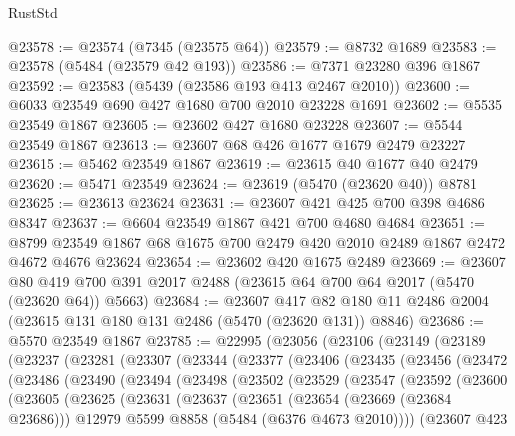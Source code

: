 \begin{lexlean}{RustStd}
\begin{coremodule}
@23578 := @23574 (@7345 (@23575 @64))
@23579 := @8732 @1689
@23583 := @23578 (@5484 (@23579 @42 @193))
@23586 := @7371 @23280 @396 @1867
@23592 := @23583 (@5439 (@23586 @193 @413 @2467 @2010))
@23600 := @6033 @23549 @690 @427 @1680 @700 @2010 @23228 @1691
@23602 := @5535 @23549 @1867
@23605 := @23602 @427 @1680 @23228
@23607 := @5544 @23549 @1867
@23613 := @23607 @68 @426 @1677 @1679 @2479 @23227
@23615 := @5462 @23549 @1867
@23619 := @23615 @40 @1677 @40 @2479
@23620 := @5471 @23549
@23624 := @23619 (@5470 (@23620 @40)) @8781
@23625 := @23613 @23624
@23631 := @23607 @421 @425 @700 @398 @4686 @8347
@23637 := @6604 @23549 @1867 @421 @700 @4680 @4684
@23651 := @8799 @23549 @1867 @68 @1675 @700 @2479 @420 @2010 @2489 @1867 @2472 @4672 @4676 @23624
@23654 := @23602 @420 @1675 @2489
@23669 := @23607
    @80
    @419
    @700
    @391
    @2017
    @2488
    (@23615 @64 @700 @64 @2017 (@5470 (@23620 @64)) @5663)
@23684 := @23607
    @417
    @82
    @180
    @11
    @2486
    @2004
    (@23615 @131 @180 @131 @2486 (@5470 (@23620 @131)) @8846)
@23686 := @5570 @23549 @1867
@23785 := @22995
    (@23056
      (@23106
        (@23149
          (@23189
            (@23237
              (@23281
                (@23307
                  (@23344
                    (@23377
                      (@23406
                        (@23435
                          (@23456
                            (@23472
                              (@23486
                                (@23490
                                  (@23494
                                    (@23498
                                      (@23502
                                        (@23529
                                          (@23547
                                            (@23592
                                              (@23600
                                                (@23605
                                                  (@23625
                                                    (@23631
                                                      (@23637
                                                        (@23651
                                                          (@23654 (@23669 (@23684 @23686)))
                                                          @12979
                                                          @5599
                                                          @8858
                                                          (@5484 (@6376 @4673 @2010))))
                                                      (@23607
                                                        @423

\end{coremodule}
\end{lexlean}
